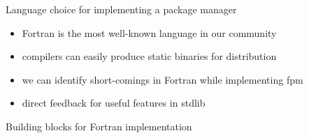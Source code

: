 \documentclass[lualatex,10pt,aspectratio=169]{beamer}
\begin{document}
\begin{frame}{Language choice for implementing a package manager}
   \begin{itemize}
      \item \alert{Fortran} is the most well-known language in our community
      \item compilers can easily produce \alert{static binaries} for distribution
      \item we can identify short-comings in Fortran while implementing fpm
      \item direct feedback for useful features in \alert{stdlib}
   \end{itemize}
\end{frame}

\begin{frame}{Building blocks for Fortran implementation}
\end{frame}
\end{document}
